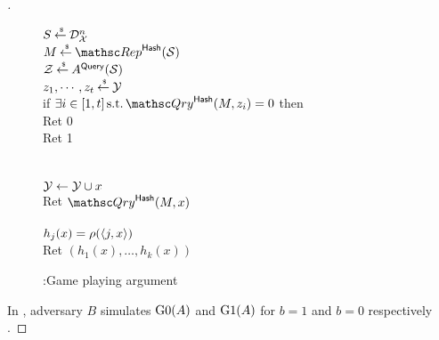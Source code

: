 \begin{proof}[]
\begin{figure}
{{$S {\:\stackrel{{\scriptscriptstyle \hspace{0.2em}\$}} {\leftarrow}\:} \mathcal{D}_{{\cal X}}^{n}$\\
$M \getsr \Rep^{\HashOracle}(\calS)$\\
${\cal Z} {\:\stackrel{{\scriptscriptstyle \hspace{0.2em}\$}} {\leftarrow}\:} A^{\mathsf{Query}}({\cal S})$\\
$z_1,\cdots, z_t {\:\stackrel{{\scriptscriptstyle \hspace{0.2em}\$}} {\leftarrow}\:} {\cal Y} $\\
if $\exists i\in[1,t] \, \mbox{s.t.} \,\Qry^{\HashOracle}(M,z_i)=0$ then\\
\nudge Ret 0\\
Ret 1\\\\
%
\\
${\cal Y} \gets {\cal Y} \cup x$\\
Ret $\Qry^{\HashOracle}(M,x)$\\
%
\\
$h_j(x) = \rho(\langle j,x \rangle)$\\
Ret $\left(h_1(x),\ldots,h_k(x)\right)$
}
}
\caption{:Game playing argument}\label{fig:GameT2}
\end{figure}

\noindent
In , adversary $B$ simulates $\text{G0}(A)$ and $\text{G1}(A)$ for $b=1$ and $b=0$ respectively .


\end{proof}

